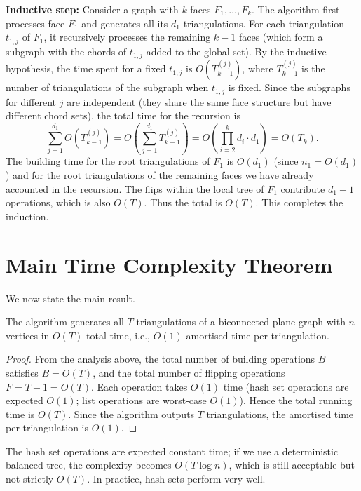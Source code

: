 \noindent\textbf{Inductive step:} Consider a graph with \(k\) faces \(F_1, \dots, F_k\). 
The algorithm first processes face \(F_1\) and generates all its \(d_1\) triangulations. 
For each triangulation \(t_{1,j}\) of \(F_1\), it recursively processes the remaining \(k-1\) faces (which form a subgraph with the chords of \(t_{1,j}\) added to the global set). 
By the inductive hypothesis, the time spent for a fixed \(t_{1,j}\) is \(O(T_{k-1}^{(j)})\), where \(T_{k-1}^{(j)}\) is the number of triangulations of the subgraph when \(t_{1,j}\) is fixed. 
Since the subgraphs for different \(j\) are independent (they share the same face structure but have different chord sets), the total time for the recursion is
\[
\sum_{j=1}^{d_1} O(T_{k-1}^{(j)}) = O\left( \sum_{j=1}^{d_1} T_{k-1}^{(j)} \right) = O\left( \prod_{i=2}^{k} d_i \cdot d_1 \right) = O(T_k).
\]
The building time for the root triangulations of \(F_1\) is \(O(d_1)\) (since \(n_1 = O(d_1)\)) and for the root triangulations of the remaining faces we have already accounted in the recursion. 
The flips within the local tree of \(F_1\) contribute \(d_1 - 1\) operations, which is also \(O(T)\). 
Thus the total is \(O(T)\). 
This completes the induction.

\section{Main Time Complexity Theorem}
\label{sec:time_theorem}

We now state the main result.

\begin{theorem}
    \label{thm:time_complexity_final}
    The algorithm generates all \(T\) triangulations of a biconnected plane graph with \(n\) vertices in \(O(T)\) total time, i.e., \(O(1)\) amortised time per triangulation.
\end{theorem}

\begin{proof}
    From the analysis above, the total number of building operations \(B\) satisfies \(B = O(T)\), and the total number of flipping operations \(F = T-1 = O(T)\). 
    Each operation takes \(O(1)\) time (hash set operations are expected \(O(1)\); list operations are worst-case \(O(1)\)). 
    Hence the total running time is \(O(T)\). 
    Since the algorithm outputs \(T\) triangulations, the amortised time per triangulation is \(O(1)\).
\end{proof}

\begin{remark}
    The hash set operations are expected constant time; if we use a deterministic balanced tree, the complexity becomes \(O(T \log n)\), which is still acceptable but not strictly \(O(T)\). 
    In practice, hash sets perform very well.
\end{remark}

